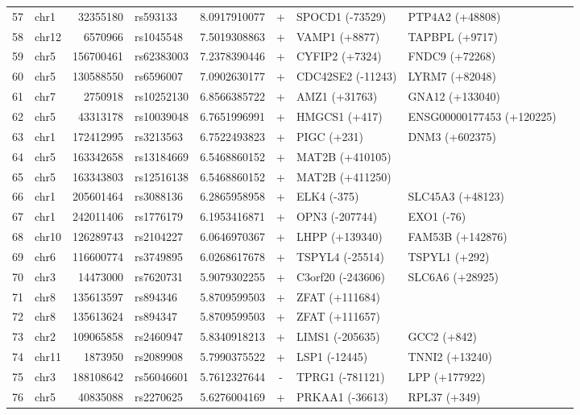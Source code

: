 \begin{table}[h!]
\begin{tabular}{rlrlrcllc}
57 & chr1 & 32355180 & rs593133 & 8.0917910077 & + & SPOCD1 (-73529) & PTP4A2 (+48808)       & \\
58 & chr12 & 6570966 & rs1045548 & 7.5019308863 & + & VAMP1 (+8877) & TAPBPL (+9717)       & \\
59 & chr5 & 156700461 & rs62383003 & 7.2378390446 & + & CYFIP2 (+7324) & FNDC9 (+72268)       & \\
60 & chr5 & 130588550 & rs6596007 & 7.0902630177 & + & CDC42SE2 (-11243) & LYRM7 (+82048)       & \\
61 & chr7 & 2750918 & rs10252130 & 6.8566385722 & + & AMZ1 (+31763) & GNA12 (+133040)       & \\
62 & chr5 & 43313178 & rs10039048 & 6.7651996991 & + & HMGCS1 (+417) & ENSG00000177453 (+120225)       & \\
63 & chr1 & 172412995 & rs3213563 & 6.7522493823 & + & PIGC (+231) & DNM3 (+602375)       & \\
64 & chr5 & 163342658 & rs13184669 & 6.5468860152 & + & MAT2B (+410105)        \\
65 & chr5 & 163343803 & rs12516138 & 6.5468860152 & + & MAT2B (+411250)        \\
66 & chr1 & 205601464 & rs3088136 & 6.2865958958 & + & ELK4 (-375) & SLC45A3 (+48123)       & \\
67 & chr1 & 242011406 & rs1776179 & 6.1953416871 & + & OPN3 (-207744) & EXO1 (-76)       & \\
68 & chr10 & 126289743 & rs2104227 & 6.0646970367 & + & LHPP (+139340) & FAM53B (+142876)       & \\
69 & chr6 & 116600774 & rs3749895 & 6.0268617678 & + & TSPYL4 (-25514) & TSPYL1 (+292)       & \\
70 & chr3 & 14473000 & rs7620731 & 5.9079302255 & + & C3orf20 (-243606) & SLC6A6 (+28925)       & \\
71 & chr8 & 135613597 & rs894346 & 5.8709599503 & + & ZFAT (+111684)        \\
72 & chr8 & 135613624 & rs894347 & 5.8709599503 & + & ZFAT (+111657)        \\
73 & chr2 & 109065858 & rs2460947 & 5.8340918213 & + & LIMS1 (-205635) & GCC2 (+842)       & \\
74 & chr11 & 1873950 & rs2089908 & 5.7990375522 & + & LSP1 (-12445) & TNNI2 (+13240)       & \\
75 & chr3 & 188108642 & rs56046601 & 5.7612327644 & - & TPRG1 (-781121) & LPP (+177922)       & \\
76 & chr5 & 40835088 & rs2270625 & 5.6276004169 & + & PRKAA1 (-36613) & RPL37 (+349)       & \\

\end{tabular}
\end{table}
